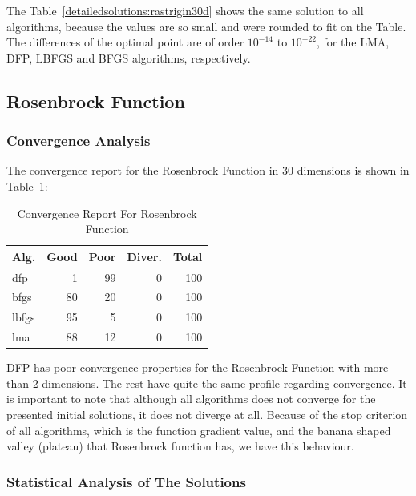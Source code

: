 \documentclass[conference]{IEEEtran}
\begin{document}
The Table~\ref{detailedsolutions:rastrigin30d} shows the same solution to all algorithms, because the values are so small
and were rounded to fit on the Table. The differences of the optimal point are of order $10^{-14}$ to $10^{-22}$,
for the LMA, DFP, LBFGS and BFGS algorithms, respectively.


\subsection{Rosenbrock Function}
\label{rosenbrock30d30D}

\subsubsection{Convergence Analysis}
\label{convergencerosenbrock30d30D}


The convergence report for the Rosenbrock Function in 30 dimensions is shown in Table~\ref{convergence:rosenbrock30d}:

\begin{table}[H]
\centering
\caption{Convergence Report For Rosenbrock Function}
\label{convergence:rosenbrock30d}
\begin{tabular}{lrrrr}
\toprule
 Alg. &  Good &  Poor &  Diver. &  Total \\
\midrule
  dfp &     1 &    99 &       0 &    100 \\
 bfgs &    80 &    20 &       0 &    100 \\
lbfgs &    95 &     5 &       0 &    100 \\
  lma &    88 &    12 &       0 &    100 \\
\bottomrule
\end{tabular}
\end{table}

DFP has poor convergence properties for the Rosenbrock Function with more than 2 dimensions.
The rest have quite the same profile regarding convergence. It is important to note that
although all algorithms does not converge for the presented initial solutions, it does not
diverge at all. Because of the stop criterion of all algorithms, which is the function gradient value,
and the banana shaped valley (plateau) that Rosenbrock function has, we have this behaviour.
\subsubsection{Statistical Analysis of The Solutions}
\label{statisticalanalysisrosenbrock30d30D}
\end{document}
